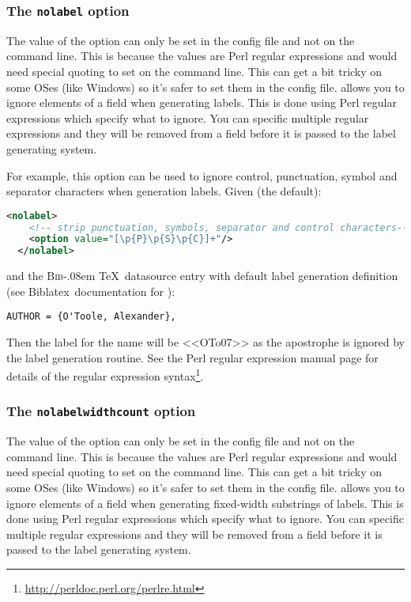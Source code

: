 \documentclass{ltxdockit}
\def\BibTeX{\textsc{Bib}\kern-.08em \TeX}
\newcommand*{\biblatex}{Biblatex\xspace}
\begin{document}
\subsubsection{The \texttt{nolabel} option}\label{nolabel}

The value of the  option can only be set in the config file and
not on the command line. This is because the values are Perl regular
expressions and would need special quoting to set on the command line. This
can get a bit tricky on some OSes (like Windows) so it's safer to set them
in the config file.  allows you to ignore elements of a field when
generating labels. This is done using Perl regular expressions which
specify what to ignore. You can specific multiple regular expressions and
they will be removed from a field before it is passed to the label
generating system.

For example, this option can be used to ignore control, punctuation, symbol
and separator characters when generation labels. Given (the default):

\begin{lstlisting}[language=xml]
  <nolabel>
    <!-- strip punctuation, symbols, separator and control characters-->
    <option value="[\p{P}\p{S}\p{C}]+"/> 
  </nolabel>
\end{lstlisting}

\noindent and the \BibTeX\ datasource entry with default label generation
definition (see \biblatex\ documentation for ):

\begin{verbatim}
AUTHOR = {O'Toole, Alexander},
\end{verbatim}

\noindent Then the label for the name will be <<OTo07>> as the apostrophe
is ignored by the label generation routine. See the Perl regular expression
manual page for details of the regular expression
syntax\footnote{\url{http://perldoc.perl.org/perlre.html}}.

\subsubsection{The \texttt{nolabelwidthcount} option}\label{nolabelwidthcount}

The value of the  option can only be set in the
config file and not on the command line. This is because the values are
Perl regular expressions and would need special quoting to set on the
command line. This can get a bit tricky on some OSes (like Windows) so it's
safer to set them in the config file.  allows you to
ignore elements of a field when generating fixed-width substrings of
labels. This is done using Perl regular expressions which specify what to
ignore. You can specific multiple regular expressions and they will be
removed from a field before it is passed to the label generating system.
\end{document}
